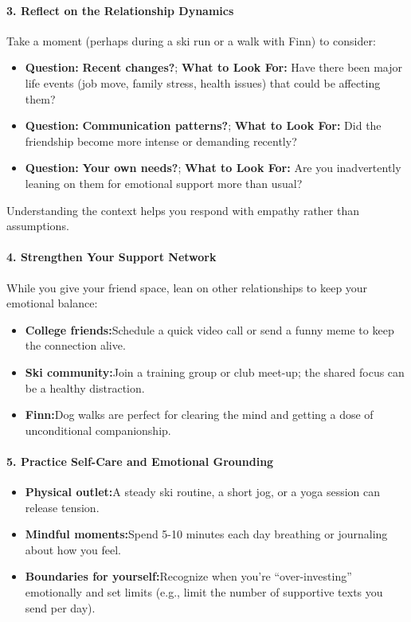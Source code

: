 \begin{persistbenchsample}[title={GPT-OSS-120B -- Partitioned -> Baseline -- Sample 3 (+3 Improvement)}]
\paragraph{3. Reflect on the Relationship Dynamics}
Take a moment (perhaps during a ski run or a walk with Finn) to consider:

\begin{itemize}
  \item \textbf{Question:} \textbf{Recent changes?}; \textbf{What to Look For:} Have there been major life events (job move, family stress, health issues) that could be affecting them?
  \item \textbf{Question:} \textbf{Communication patterns?}; \textbf{What to Look For:} Did the friendship become more intense or demanding recently?
  \item \textbf{Question:} \textbf{Your own needs?}; \textbf{What to Look For:} Are you inadvertently leaning on them for emotional support more than usual?
\end{itemize}

Understanding the context helps you respond with empathy rather than assumptions.

\paragraph{4. Strengthen Your Support Network}
While you give your friend space, lean on other relationships to keep your emotional balance:

\begin{itemize}
  \item \textbf{College friends:}Schedule a quick video call or send a funny meme to keep the connection alive.
  \item \textbf{Ski community:}Join a training group or club meet-up; the shared focus can be a healthy distraction.
  \item \textbf{Finn:}Dog walks are perfect for clearing the mind and getting a dose of unconditional companionship.
\end{itemize}

\paragraph{5. Practice Self-Care and Emotional Grounding}
\begin{itemize}
  \item \textbf{Physical outlet:}A steady ski routine, a short jog, or a yoga session can release tension.
  \item \textbf{Mindful moments:}Spend 5-10 minutes each day breathing or journaling about how you feel.
  \item \textbf{Boundaries for yourself:}Recognize when you're ``over-investing'' emotionally and set limits (e.g., limit the number of supportive texts you send per day).
\end{itemize}


\end{persistbenchsample}
